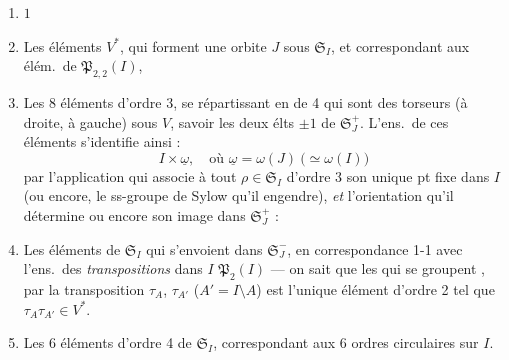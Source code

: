 \documentclass[11pt,a4paper]{article}
\begin{document}
\begin{enumerate}
  \item[a)] $1$
  \item[b)] Les  éléments \struck{\ill{}}  $V^*$, qui forment
    une orbite $J$ sous $\mathfrak{S}_I$, et correspondant aux élém.\ de
    $\mathfrak{P}_{2,2}(I)$,
  \item[c)] Les \ill{} 8 éléments d'ordre 3, se répartissant en
       \ill{} de 4 qui sont des
    torseurs (à droite, à gauche) sous $V$, savoir les deux élts $\pm 1$ de
    $\mathfrak{S}_J^+$. L'ens.\ de ces éléments s'identifie ainsi :
    \[
      I \times \underline{\omega}, \quad \text{où } \underline{\omega}
      = \omega(J)\ \bigl(\simeq \omega(I)\bigr)
    \]
    par l'application qui associe à tout $\rho \in \mathfrak{S}_I$ d'ordre 3
    son unique pt fixe dans $I$ (ou encore, le ss-groupe de Sylow qu'il
    engendre), \emph{et} l'orientation qu'il détermine \struck{\ill{}} ou
    encore son image dans $\mathfrak{S}_J^+$ :
  \item[d)] Les \struck{\ill{}}  éléments  \struck{\ill{}}
    de $\mathfrak{S}_I$ qui s'envoient dans $\mathfrak{S}_J^-$, en
    correspondance 1-1 avec l'ens.\ des \emph{transpositions} dans $I$
    $\mathfrak{P}_2(I)$ --- on sait que les \ill{} qui se groupent
     \struck{\ill{}} , par la transposition
    $\tau_A$, $\tau_{A'}$ \struck{\ill{}} ($A' = I \setminus A$) est l'unique
     élément d'ordre 2 tel que $\tau_A \tau_{A'} \in V^*$.
  \item[e)] Les 6 éléments d'ordre 4 de $\mathfrak{S}_I$, correspondant aux
    6 ordres circulaires sur $I$. 
\end{enumerate}
\end{document}
